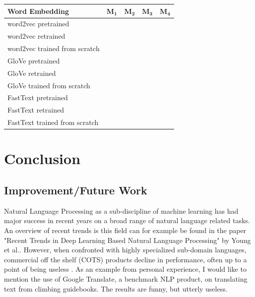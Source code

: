 \documentclass[10pt,a4paper]{article}
\begin{document}
	\begin{center}
		\begin{tabular}{|l| c| c| c|c|}
			\hline
			\textbf{Word Embedding} & $\boldsymbol{M_1}$ & $\boldsymbol{M_2}$ & $\boldsymbol{M_3}$ & $\boldsymbol{M_4}$\\ 
			\hline
			word2vec pretrained & \textbullet & \textbullet & \textbullet & \textbullet\\  \hline
			word2vec retrained & \textbullet & \textbullet & \textbullet & \textbullet\\  	\hline
			word2vec trained from scratch  & \textbullet & \textbullet & \textbullet & \textbullet\\  	\hline
			GloVe pretrained & \textbullet & \textbullet & \textbullet & \textbullet\\  
			\hline
			GloVe retrained & \textbullet & \textbullet & \textbullet & \textbullet\\
			\hline
			GloVe trained from scratch  & \textbullet & \textbullet & \textbullet & \textbullet\\  	
			\hline
			FastText pretrained & \textbullet & \textbullet & \textbullet & \textbullet\\  \hline
			FastText retrained & \textbullet & \textbullet & \textbullet & \textbullet\\  	\hline
			FastText trained from scratch  & \textbullet & \textbullet & \textbullet & \textbullet\\  	
			\hline
			
			
		\end{tabular}
	\end{center}
	\section{Conclusion}
	
	\subsection{Improvement/Future Work}
	
	
	Natural Language Processing as a sub-discipline of machine learning has had major success in recent years on a broad range of natural language related tasks. An overview of recent trends is this field can for example be found in the paper \cite{1708.02709} "Recent Trends in Deep Learning Based Natural Language Processing" by Young et al.. 
	However, when confronted with highly specialized sub-domain languages, commercial off the shelf (COTS) products decline in performance, often up to a point of being useless \cite{OilandGas}. As an example from personal experience, I would like to mention the use of Google Translate, a benchmark NLP product, on translating text from climbing guidebooks. The results are funny, but utterly useless.
	
\end{document}
